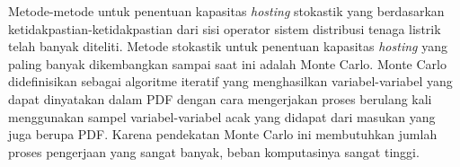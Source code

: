 {{Metode-metode untuk penentuan kapasitas \textit{hosting} stokastik yang berdasarkan ketidakpastian-ketidakpastian dari sisi operator sistem distribusi tenaga listrik telah banyak diteliti\cite{Dubey2017,Ding2017,Bollen2017,Torquato2018,Vergara2020,Deakin2019}.
Metode stokastik untuk penentuan kapasitas \textit{hosting} yang paling banyak dikembangkan sampai saat ini adalah Monte Carlo. 
Monte Carlo didefinisikan sebagai algoritme iteratif yang menghasilkan variabel-variabel yang dapat dinyatakan dalam PDF dengan cara mengerjakan proses berulang kali menggunakan sampel variabel-variabel acak yang didapat dari masukan yang juga berupa PDF. Karena pendekatan Monte Carlo ini membutuhkan jumlah proses pengerjaan yang sangat banyak, beban komputasinya sangat tinggi. 

}}
